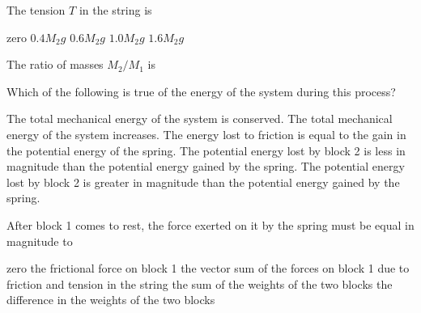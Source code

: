 \documentclass[12pt]{../oss-classkick-exam}
\begin{document}
\begin{questions}
  \question The tension $T$ in the string is \label{connect1}
  \begin{choices}
    \choice zero
    \choice $0.4M_2g$
    \choice $0.6M_2g$
    \choice $1.0M_2g$
    \choice $1.6M_2g$
  \end{choices}
  
  \question The ratio of masses $M_2/M_1$ is  \label{connect2}
  \begin{choices}
  \end{choices}
  

  \question Which of the following is true of the energy of the system during
  this process?
  \begin{choices}
    \choice The total mechanical energy of the system is conserved.
    \choice The total mechanical energy of the system increases.
    \choice The energy lost to friction is equal to the gain in the potential
    energy of the spring.
    \choice  The potential energy lost by block 2 is less in magnitude than the
    potential energy gained by the spring.
    \choice The potential energy lost by block 2 is greater in magnitude than
    the potential energy gained by the spring.
  \end{choices}
  \label{spring1}

  \question After block 1 comes to rest, the force exerted on it by the spring
  must be equal in magnitude to
  \begin{choices}
    \choice zero
    \choice the frictional force on block 1
    \choice the vector sum of the forces on block 1 due to friction and tension
    in the string
    \choice the sum of the weights of the two blocks
    \choice the difference in the weights of the two blocks
  \end{choices}
  \label{spring2}
  

\end{questions}
\end{document}
